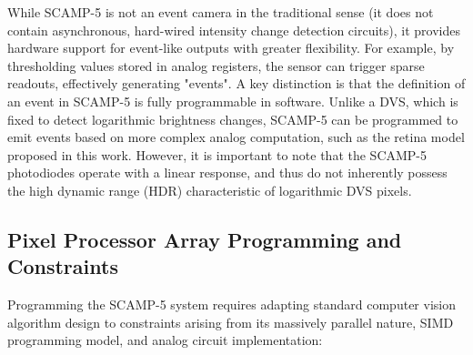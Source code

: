 \documentclass{article}
\begin{document}
While SCAMP-5 is not an event camera in the traditional sense (it does not contain asynchronous, hard-wired intensity change detection circuits), it provides hardware support for event-like outputs with greater flexibility. For example, by thresholding values stored in analog registers, the sensor can trigger sparse readouts, effectively generating "events". A key distinction is that the definition of an event in SCAMP-5 is fully programmable in software. Unlike a DVS, which is fixed to detect logarithmic brightness changes, SCAMP-5 can be programmed to emit events based on more complex analog computation, such as the retina model proposed in this work. However, it is important to note that the SCAMP-5 photodiodes operate with a linear response, and thus do not inherently possess the high dynamic range (HDR) characteristic of logarithmic DVS pixels.


\subsection{Pixel Processor Array Programming and Constraints}
\label{sec:constraints}
Programming the SCAMP-5 system requires adapting standard computer vision algorithm design to constraints arising from its massively parallel nature, SIMD programming model, and analog circuit implementation: 
\end{document}
